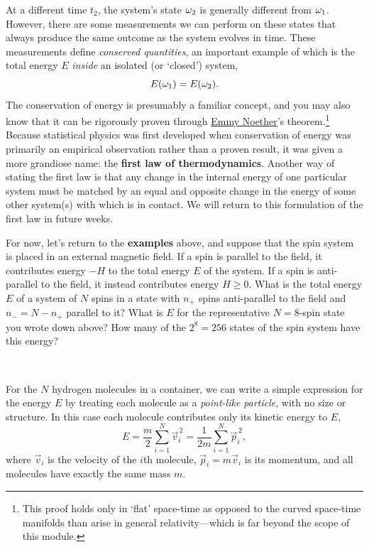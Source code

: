 At a different time $t_2$, the system's state $\omega_2$ is generally different from $\omega_1$.
However, there are some measurements we can perform on these states that always produce the same outcome as the system evolves in time.
These measurements define \textit{conserved quantities}, an important example of which is the total energy $E$ \textit{inside} an isolated (or `closed') system,
\begin{equation*}
  E(\omega_1) = E(\omega_2).
\end{equation*}
The conservation of energy is presumably a familiar concept, and you may also know that it can be rigorously proven through \href{https://en.wikipedia.org/wiki/Emmy_Noether}{Emmy Noether}'s theorem.\footnote{This proof holds only in `flat' space-time as opposed to the curved space-time manifolds than arise in general relativity---which is far beyond the scope of this module.}
Because statistical physics was first developed when conservation of energy was primarily an empirical observation rather than a proven result, it was given a more grandiose name: the \textbf{first law of thermodynamics}.
Another way of stating the first law is that any change in the internal energy of one particular system \Om must be matched by an equal and opposite change in the energy of some other system(s) with which \Om is in contact.
We will return to this formulation of the first law in future weeks.

For now, let's return to the \textbf{examples} above, and suppose that the spin system is placed in an external magnetic field.
If a spin is parallel to the field, it contributes energy $-H$ to the total energy $E$ of the system.
If a spin is anti-parallel to the field, it instead contributes energy $H \geq 0$.
What is the total energy $E$ of a system of $N$ spins in a state with $n_+$ spins anti-parallel to the field and $n_- = N - n_+$ parallel to it?
What is $E$ for the representative $N = 8$-spin state you wrote down above?
How many of the $2^8 = 256$ states of the spin system have this energy?
\begin{mdframed}
  \ \\[100 pt]
\end{mdframed}
For the $N$ hydrogen molecules in a container, we can write a simple expression for the energy $E$ by treating each molecule as a \textit{point-like particle}, with no size or structure.
In this case each molecule contributes only its kinetic energy to $E$,
\begin{equation*}
  E = \frac{m}{2} \sum_{i = 1}^N \vec{v}_i^{\,2} = \frac{1}{2m} \sum_{i = 1}^N \vec{p}_i^{\,2},
\end{equation*}
where $\vec v_i$ is the velocity of the $i$th molecule, $\vec p_i = m \vec v_i$ is its momentum, and all molecules have exactly the same mass $m$.

